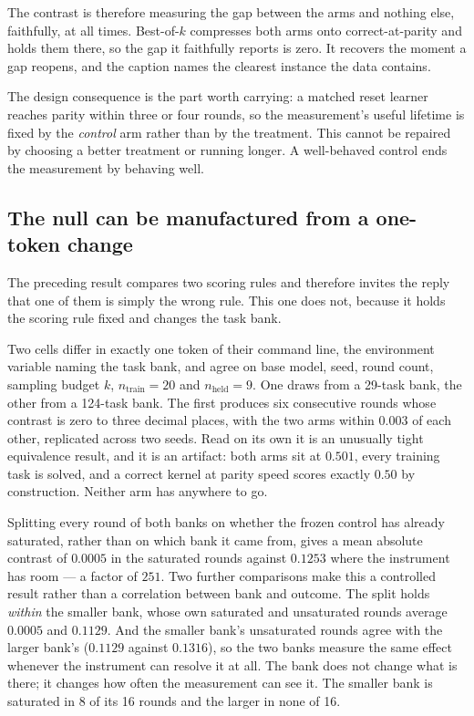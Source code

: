 The contrast is therefore measuring the gap between the arms and nothing else, faithfully, at all
times. Best-of-$k$ compresses both arms onto correct-at-parity and holds them there, so the gap
it faithfully reports is zero. It recovers the moment a gap reopens, and the caption names the
clearest instance the data contains.

The design consequence is the part worth carrying: a matched reset learner reaches parity within
three or four rounds, so the measurement's useful lifetime is fixed by the \emph{control} arm
rather than by the treatment. This cannot be repaired by choosing a better treatment or running
longer. A well-behaved control ends the measurement by behaving well.

\subsection{The null can be manufactured from a one-token change}
\label{sec:motivation:bank}

The preceding result compares two scoring rules and therefore invites the reply that one of them
is simply the wrong rule. This one does not, because it holds the scoring rule fixed and changes
the task bank.

Two cells differ in exactly one token of their command line, the environment variable naming the
task bank, and agree on base model, seed, round count, sampling budget $k$,
$n_{\mathrm{train}}=20$ and $n_{\mathrm{held}}=9$. One draws from a 29-task bank, the other from
a 124-task bank. The first produces six consecutive rounds whose contrast is zero to three
decimal places, with the two arms within $0.003$ of each other, replicated across two seeds.
Read on its own it is an unusually tight equivalence result, and it is an artifact: both arms
sit at $0.501$, every training task is solved, and a correct kernel at parity speed scores
exactly $0.50$ by construction. Neither arm has anywhere to go.

Splitting every round of both banks on whether the frozen control has already saturated, rather
than on which bank it came from, gives a mean absolute contrast of $0.0005$ in the saturated
rounds against $0.1253$ where the instrument has room --- a factor of $251$. Two further
comparisons make this a controlled result rather than a correlation between bank and outcome.
The split holds \emph{within} the smaller bank, whose own saturated and unsaturated rounds
average $0.0005$ and $0.1129$. And the smaller bank's unsaturated rounds agree with the larger
bank's ($0.1129$ against $0.1316$), so the two banks measure the same effect whenever the
instrument can resolve it at all. The bank does not change what is there; it changes how often
the measurement can see it. The smaller bank is saturated in 8 of its 16 rounds and the larger
in none of 16.

